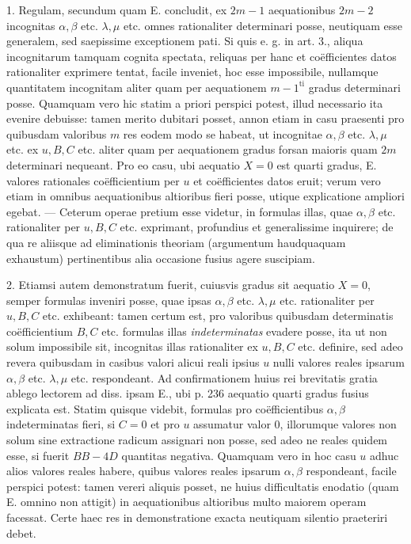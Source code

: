 1. Regulam, secundum quam E. concludit, ex $2m-1$ aequationibus
$2m-2$ incognitas $\alpha,\beta$ etc. $\lambda,\mu$ etc. omnes rationaliter determinari posse,
neutiquam esse generalem, sed saepissime exceptionem pati. Si quis e. g. in art. 3.,
aliqua incognitarum tamquam cognita spectata, reliquas per hanc et coëfficientes
datos rationaliter exprimere tentat, facile inveniet, hoc esse impossibile, nullamque
quantitatem incognitam aliter quam per aequationem $m-1^{\mathrm{ti}}$ gradus
determinari posse. Quamquam vero hic statim a priori perspici potest, illud
necessario ita evenire debuisse: tamen merito dubitari posset, annon etiam in casu
praesenti pro quibusdam valoribus $m$ res eodem modo se habeat, ut incognitae
$\alpha,\beta$ etc. $\lambda,\mu$ etc. ex $u,B,C$ etc. aliter quam per aequationem gradus forsan
maioris quam $2m$ determinari nequeant. Pro eo casu, ubi aequatio $X=0$ est
quarti gradus, E. valores rationales coëfficientium per $u$ et coëfficientes datos eruit;
verum vero etiam in omnibus aequationibus altioribus fieri posse, utique explicatione
ampliori egebat. --- Ceterum operae pretium esse videtur, in formulas illas,
quae $\alpha,\beta$ etc. rationaliter per $u,B,C$ etc. exprimant, profundius et
generalissime inquirere; de qua re aliisque ad eliminationis theoriam (argumentum
haudquaquam exhaustum) pertinentibus alia occasione fusius agere suscipiam.

2. Etiamsi autem demonstratum fuerit, cuiusvis gradus sit aequatio $X=0$,
semper formulas inveniri posse, quae ipsas $\alpha,\beta$ etc. $\lambda,\mu$ etc. rationaliter per
$u,B,C$ etc. exhibeant: tamen certum est, pro valoribus quibusdam determinatis
coëfficientium $B,C$ etc. formulas illas \textit{indeterminatas} evadere posse, ita ut non
solum impossibile sit, incognitas illas rationaliter ex $u,B,C$ etc. definire, sed
adeo revera quibusdam in casibus valori alicui reali ipsius $u$ nulli valores reales
ipsarum $\alpha,\beta$ etc. $\lambda,\mu$ etc. respondeant. Ad confirmationem huius rei brevitatis
gratia ablego lectorem ad diss. ipsam E., ubi p. 236 aequatio quarti gradus fusius
explicata est. Statim quisque videbit, formulas pro coëfficientibus $\alpha,\beta$ indeterminatas fieri, si $C=0$ et pro $u$ assumatur valor $0$, illorumque valores non solum
sine extractione radicum assignari non posse, sed adeo ne reales quidem esse,
si fuerit $BB-4D$ quantitas negativa. Quamquam vero in hoc casu $u$ adhuc
alios valores reales habere, quibus valores reales ipsarum $\alpha,\beta$ respondeant,
facile perspici potest: tamen vereri aliquis posset, ne huius difficultatis enodatio
(quam E. omnino non attigit) in aequationibus altioribus multo maiorem operam
facessat. Certe haec res in demonstratione exacta neutiquam silentio praeteriri
debet.

